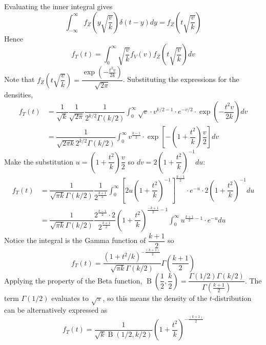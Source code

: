 \documentclass[11pt]{report} %
\begin{document}
Evaluating the inner integral gives
\begin{equation}
\int_{-\infty}^{\infty}f_{Z}\left(y\sqrt{\dfrac{v}{k}}\right)\delta\left(t-y\right)dy=f_{Z}\left(t\sqrt{\dfrac{v}{k}}\right)
\end{equation}
Hence
\begin{equation}
f_{T}\left(t\right)=\int_{0}^{\infty}\sqrt{\dfrac{v}{k}}f_{V}\left(v\right)f_{Z}\left(t\sqrt{\dfrac{v}{k}}\right)dv
\end{equation}
Note that $f_{Z}\left(t\sqrt{\dfrac{v}{k}}\right)=\dfrac{\exp\left(-\frac{t^{2}v}{2k}\right)}{\sqrt{2\pi}}$. Substituting the expressions for the densities,
\begin{align}
f_{T}\left(t\right) &= \dfrac{1}{\sqrt{k}}\dfrac{1}{\sqrt{2\pi}}\dfrac{1}{2^{k/2}\Gamma\left(k/2\right)}\int_{0}^{\infty}\sqrt{v}\cdot v^{k/2-1}\cdot e^{-v/2}\cdot\exp\left(-\dfrac{t^{2}v}{2k}\right)dv \\
&= \dfrac{1}{\sqrt{2\pi k}2^{k/2}\Gamma\left(k/2\right)}\int_{0}^{\infty}v^{\frac{k-1}{2}}\cdot\exp\left[-\left(1+\dfrac{t^{2}}{k}\right)\dfrac{v}{2}\right]dv
\end{align}
Make the substitution $u = \left(1+\dfrac{t^{2}}{k}\right)\dfrac{v}{2}$ so $dv = 2\left(1+\dfrac{t^{2}}{k}\right)^{-1}du$:
\begin{align}
f_{T}\left(t\right) &= \dfrac{1}{\sqrt{\pi k}\Gamma\left(k/2\right)}\dfrac{1}{2^{\frac{k+1}{2}}}\int_{0}^{\infty}\left[2u\left(1+\dfrac{t^{2}}{k}\right)^{-1}\right]^{\frac{k-1}{2}}\cdot e^{-u}\cdot2\left(1+\dfrac{t^{2}}{k}\right)^{-1}du \\
&= \dfrac{1}{\sqrt{\pi k}\Gamma\left(k/2\right)}\dfrac{2^{\frac{k-1}{2}}\cdot2}{2^{\frac{k+1}{2}}}\left(1+\dfrac{t^{2}}{k}\right)^{\frac{-k+1}{2}-1}\int_{0}^{\infty}u^{\frac{k+1}{2}-1}\cdot e^{-u}du
\end{align}
Notice the integral is the Gamma function of $\dfrac{k+1}{2}$ so
\begin{equation}
f_{T}\left(t\right)=\dfrac{\left(1+t^{2}/k\right)^{-\frac{\left(k+1\right)}{2}}}{\sqrt{\pi k}\Gamma\left(k/2\right)}\Gamma\left(\dfrac{k+1}{2}\right)
\end{equation}
Applying the property of the Beta function, $\operatorname{B}\left(\dfrac{1}{2}, \dfrac{k}{2}\right) = \dfrac{\Gamma\left(1/2\right)\Gamma\left(k/2\right)}{\Gamma\left(\frac{k+1}{2}\right)}$. The term $\Gamma\left(1/2\right)$ evaluates to $\sqrt{\pi}$, so this means the density of the $t$-distribution can be alternatively expressed as
\begin{equation}
f_{T}\left(t\right)= \dfrac{1}{\sqrt{k}\operatorname{B}\left(1/2, k/2\right)}\left(1+\dfrac{t^{2}}{k}\right)^{-\frac{\left(k+1\right)}{2}}
\end{equation}
\end{document}
